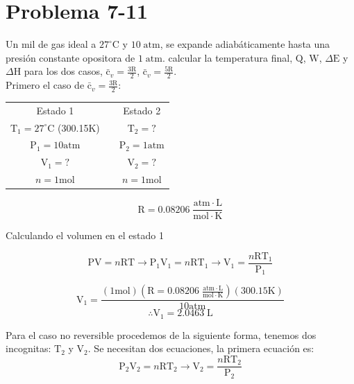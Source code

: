 \documentclass[12pt]{article}
\begin{document}
\section*{Problema 7-11}
Un mil de gas ideal a $27^{\circ}\mathrm{C}$ y $10 \; \mathrm{atm}$, se expande adiabáticamente hasta una presión constante opositora de $1\;\mathrm{atm}$. calcular la temperatura final, $\mathrm{Q}$, $\mathrm{W}$, $\Delta\mathrm{E}$ y $\Delta\mathrm{H}$ para los dos casos, $\mathrm{\bar{c}}_v=\frac{3\mathrm{R}}{2}$, $\mathrm{\bar{c}}_v=\frac{5\mathrm{R}}{2}$.\\

Primero el caso de $\mathrm{\bar{c}}_v=\frac{3\mathrm{R}}{2}$:
\begin{center}
	\begin{tabular}{c c c}
		Estado 1 &   &  Estado 2 \\
		$\mathrm{T}_1=27^{\circ}\mathrm{C}$\; (300.15$\mathrm{K}$) &   & $\mathrm{T}_2=?$ \\
		$\mathrm{P}_1=10\mathrm{atm}$ &   & $\mathrm{P}_2=1\mathrm{atm}$ \\
		$\mathrm{V}_1=?$ &   & $\mathrm{V}_2=?$\\
		$n=1\mathrm{mol}$&   & $n=1\mathrm{mol}$
	\end{tabular}
\begin{displaymath}
	\mathrm{R}=0.08206\; \frac{\mathrm{atm}\cdot\mathrm{L}}{\mathrm{mol}\cdot\mathrm{K}}
\end{displaymath}
\end{center}

Calculando el volumen en el estado 1

\begin{displaymath}
	\mathrm{P}\mathrm{V}=n\mathrm{R}\mathrm{T} \rightarrow \mathrm{P}_1\mathrm{V}_1=n\mathrm{R}\mathrm{T}_1 \rightarrow \mathrm{V}_1=\frac{n\mathrm{R}\mathrm{T}_1}{\mathrm{P}_1}
\end{displaymath}

\begin{displaymath}
	\mathrm{V}_1=\frac{(1\mathrm{mol})(	\mathrm{R}=0.08206\; \frac{\mathrm{atm}\cdot\mathrm{L}}{\mathrm{mol}\cdot\mathrm{K}})(300.15\mathrm{K})}{10\mathrm{atm}}
\end{displaymath}
\begin{displaymath}
	\therefore\mathrm{V}_1=2.0463 \;\mathrm{L}
\end{displaymath}

Para el caso no reversible procedemos de la siguiente forma, tenemos dos incognitas: $\mathrm{T}_2$ y $\mathrm{V}_2$. Se necesitan dos ecuaciones, la primera ecuación es:
\begin{displaymath}
	\mathrm{P}_2\mathrm{V}_2=n\mathrm{R}\mathrm{T}_2 \rightarrow \mathrm{V}_2=\frac{n\mathrm{R}\mathrm{T}_2}{\mathrm{P}_2}
\end{displaymath}
\end{document}
